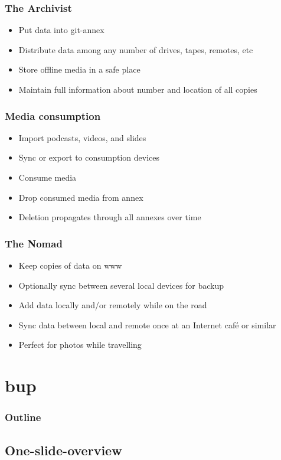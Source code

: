 \documentclass[t]{beamer}
\begin{document}
\begin{frame}
	\frametitle{The Archivist}
	\begin{itemize}
		\item Put data into git-annex
		\item Distribute data among any number of drives, tapes, remotes, etc
		\item Store offline media in a safe place
		\item Maintain full information about number and location of all copies
	\end{itemize}
\end{frame}

\begin{frame}
	\frametitle{Media consumption}
	\begin{itemize}
		\item Import podcasts, videos, and slides
		\item Sync or export to consumption devices
		\item Consume media
		\item Drop consumed media from annex
		\item Deletion propagates through all annexes over time
	\end{itemize}
\end{frame}

\begin{frame}
	\frametitle{The Nomad}
	\begin{itemize}
		\item Keep copies of data on www
		\item Optionally sync between several local devices for backup
		\item Add data locally and/or remotely while on the road
		\item Sync data between local and remote once at an Internet café or similar
		\item Perfect for photos while travelling
	\end{itemize}
\end{frame}


\section{bup}

\begin{frame}
	\frametitle{Outline}
	\tableofcontents[currentsection]
\end{frame}

\subsection{One-slide-overview}
\end{document}
